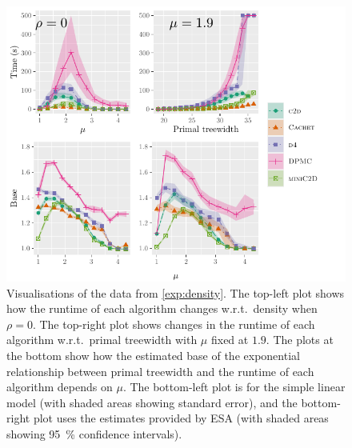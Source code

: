 \documentclass[runningheads]{llncs}
\begin{document}
\begin{figure}[t]
  \centering
  \includegraphics{treewidth}
  \caption[Visualisations of the data from \cref{exp:density}. The top-left plot
  shows how the runtime of each algorithm changes w.r.t.\ density when
  $\rho = 0$. The top-right plot shows changes in the runtime of each algorithm
  w.r.t.\ primal treewidth with $\mu$ fixed at $1.9$. The plots at the bottom
  show how the estimated base of the exponential relationship between primal
  treewidth and the runtime of each algorithm depends on $\mu$. The bottom-left
  plot is for the simple linear model (with shaded areas showing standard
  error), and the bottom-right plot uses the estimates provided by ESA (with
  shaded areas showing \SI{95}{\percent} confidence intervals).]%
  {Visualisations of the data from \cref{exp:density}. The top-left plot shows
    how the runtime of each algorithm changes w.r.t.\ density when $\rho = 0$.
    The top-right plot shows changes in the runtime of each algorithm w.r.t.\
    primal treewidth with $\mu$ fixed at $1.9$. The plots at the bottom show how
    the estimated base of the exponential relationship between primal treewidth
    and the runtime of each algorithm depends on $\mu$. The bottom-left plot is
    for the simple linear model (with shaded areas showing standard error),
    and the bottom-right plot uses the estimates provided by ESA
    \protect{\cite{DBLP:conf/gecco/PushakH20}} (with shaded areas showing
    \SI{95}{\percent} confidence intervals).}\label{fig:treewidth}
\end{figure}
\end{document}
